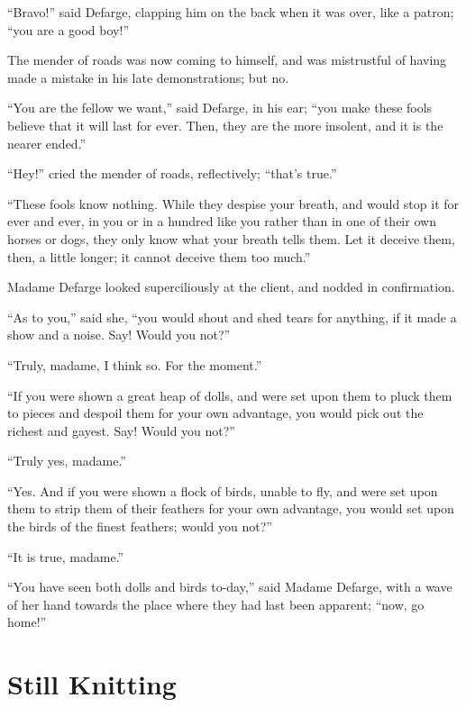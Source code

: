 ``Bravo!'' said Defarge, clapping him on the back when it was over,
like a patron; ``you are a good boy!''

The mender of roads was now coming to himself, and was mistrustful of
having made a mistake in his late demonstrations; but no.

``You are the fellow we want,'' said Defarge, in his ear; ``you make these
fools believe that it will last for ever.  Then, they are the more
insolent, and it is the nearer ended.''

``Hey!'' cried the mender of roads, reflectively; ``that's true.''

``These fools know nothing.  While they despise your breath, and would
stop it for ever and ever, in you or in a hundred like you rather than
in one of their own horses or dogs, they only know what your breath
tells them.  Let it deceive them, then, a little longer; it cannot
deceive them too much.''

Madame Defarge looked superciliously at the client, and nodded in
confirmation.

``As to you,'' said she, ``you would shout and shed tears for anything,
if it made a show and a noise.  Say!  Would you not?''

``Truly, madame, I think so.  For the moment.''

``If you were shown a great heap of dolls, and were set upon them to
pluck them to pieces and despoil them for your own advantage, you
would pick out the richest and gayest.  Say!  Would you not?''

``Truly yes, madame.''

``Yes.  And if you were shown a flock of birds, unable to fly, and were
set upon them to strip them of their feathers for your own advantage,
you would set upon the birds of the finest feathers; would you not?''

``It is true, madame.''

``You have seen both dolls and birds to-day,'' said Madame Defarge,
with a wave of her hand towards the place where they had last been
apparent; ``now, go home!''



\chapter{Still Knitting}


